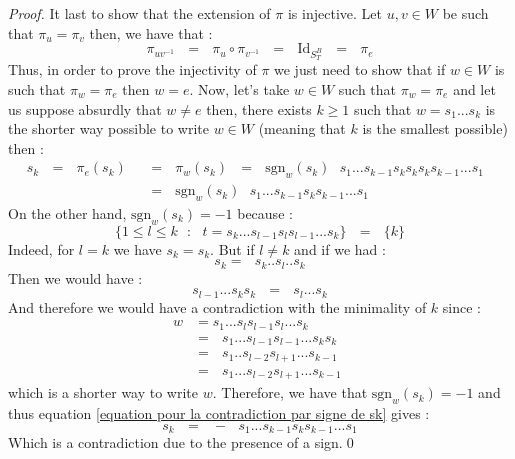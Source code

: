 \documentclass[envcountsame,envcountchap]{svmono}
\newcommand{\qq}{\text{ }}
\begin{document}
\begin{proof}
	It last to show that the extension of $\pi$ is injective. Let $u,v\in W$ be such that $\pi_u=\pi_v$ then, we have that :
	\begin{equation}
	\pi_{uv^{-1}}\qq=\qq \pi_u\circ \pi_{v^{-1}}\qq=\qq \mbox{Id}_{S_T^B}\qq=\qq  \pi_e
	\end{equation}
	Thus, in order to prove the injectivity of $\pi$ we just need to show that if $w\in W$ is such that $\pi_w=\pi_e$ then $w=e$. Now, let's take $w\in W$ such that $\pi_w=\pi_e$ and let us suppose absurdly that $w\not=e$ then, there exists $k\geq 1$ such that $w=s_1...s_k$ is the shorter way possible to write $w\in W$ (meaning that $k$ is the smallest possible) then :
	\begin{equation}\label{equation pour la contradiction par signe de sk}
	\begin{split}
		s_k\qq=\qq\pi_e(s_k)\qq&=\qq \pi_w(s_k)\qq =\qq\mbox{sgn}_w(s_k)\qq s_1...s_{k-1}s_ks_ks_ks_{k-1}...s_1\qq\\
		&=\qq\mbox{sgn}_w(s_k)\qq s_1...s_{k-1}s_ks_{k-1}...s_1
	\end{split}
	\end{equation}
	On the other hand, $\mbox{sgn}_w(s_k)=-1$ because :
	\begin{equation}
	\{1\leq l\leq k\qq :\qq t=s_k...s_{l-1}s_l s_{l-1}...s_k\}\qq=\qq \{k\}
	\end{equation}
	Indeed, for $l=k$ we have $s_k=s_k$. But if $l\not=k$ and if we had :
	\begin{equation}
	s_k=\qq s_k..s_l..s_k
	\end{equation}
	Then we would have :
	\begin{equation}
	s_{l-1}...s_ks_k\qq=\qq s_l...s_k
	\end{equation}
	And therefore  we would have a contradiction with the minimality of $k$ since :
	\begin{equation}
	\begin{split}
	w&=s_1...s_ls_{l-1}s_l...s_k\qq\\
	&=\qq s_1...s_{l-1}s_{l-1}...s_ks_k\qq\\
	&=\qq s_1..s_{l-2}s_{l+1}...s_{k-1}\qq\\
	&=\qq s_1...s_{l-2}s_{l+1}...s_{k-1}
	\end{split}
	\end{equation}
	which is a shorter way to write $w$. Therefore, we have that $\mbox{sgn}_w(s_k)=-1$ and thus equation \ref{equation pour la contradiction par signe de sk} gives :
	\begin{equation}
			s_k\qq=\qq -\qq  s_1...s_{k-1}s_ks_{k-1}...s_1
	\end{equation}
	Which is a contradiction due to the presence of a sign.\qed
	\end{proof}
\end{document}
